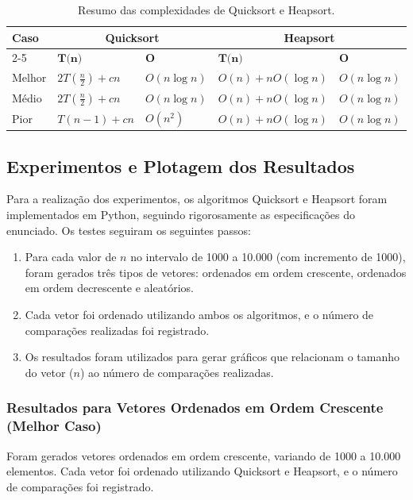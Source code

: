 \documentclass[12pt]{article}
\begin{document}
\begin{table}[h!]
\centering
\begin{tabular}{|l|l|l|l|l|}
\hline
\multirow{2}{*}{\textbf{Caso}} & \multicolumn{2}{|c|}{\textbf{Quicksort}} & \multicolumn{2}{|c|}{\textbf{Heapsort}} \\
\cline{2-5}
 & $\textbf{T(n)}$ & $\textbf{O}$ & $\textbf{T(n)}$ & $\textbf{O}$ \\
\hline
Melhor & $2T(\frac{n}{2}) + cn$ & $O(n \log n)$ & $O(n) + nO(\log n)$ & $O(n \log n)$ \\
\hline
Médio  & $2T(\frac{n}{2}) + cn$ & $O(n \log n)$ & $O(n) + nO(\log n)$ & $O(n \log n)$ \\
\hline
Pior   & $T(n-1) + cn$ & $O(n^2)$ & $O(n) + nO(\log n)$ & $O(n \log n)$ \\
\hline
\end{tabular}
\caption{Resumo das complexidades de Quicksort e Heapsort.}
\label{tab:complexidade}
\end{table}


\subsection{Experimentos e Plotagem dos Resultados}

Para a realização dos experimentos, os algoritmos Quicksort e Heapsort foram implementados em Python, seguindo rigorosamente as especificações do enunciado. Os testes seguiram os seguintes passos:

\begin{enumerate}
    \item Para cada valor de $n$ no intervalo de 1000 a 10.000 (com incremento de 1000), foram gerados três tipos de vetores: ordenados em ordem crescente, ordenados em ordem decrescente e aleatórios.
    \item Cada vetor foi ordenado utilizando ambos os algoritmos, e o número de comparações realizadas foi registrado.
    \item Os resultados foram utilizados para gerar gráficos que relacionam o tamanho do vetor ($n$) ao número de comparações realizadas.
\end{enumerate}

\subsubsection{Resultados para Vetores Ordenados em Ordem Crescente (Melhor Caso)}

Foram gerados vetores ordenados em ordem crescente, variando de 1000 a 10.000 elementos. Cada vetor foi ordenado utilizando Quicksort e Heapsort, e o número de comparações foi registrado.
\end{document}
